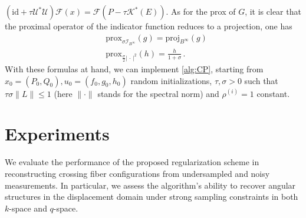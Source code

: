\documentclass[journal,twoside,web]{ieeecolor}
\begin{document}
$ (\mathrm{id}+\tau\mathcal{U}^*\mathcal{U})\mathcal{F}(x)=\mathcal{F}({P-\tau \mathcal{K}^*(E)}) $.
As for the prox of $G$, it is clear that the proximal operator of the indicator function reduces to a projection, one has
\begin{subequations}
\begin{alignat}{2}
    & \mathrm{prox}_{\sigma\mathcal{I}_{B^\infty}}(g) = \mathrm{proj}_{B^\infty}(g) \\
    & \mathrm{prox}_{\tfrac{\sigma}{2}|\,\cdot\,|^2}(h) = \frac{h}{1+\sigma} \, .
\end{alignat}
\end{subequations}
With these formulas at hand, we can implement \eqref{alg:CP}, starting from $x_0=(P_0,Q_0), u_0=(f_0,g_0,h_0)$ random initializations, $\tau,\sigma>0$ such that $\tau\sigma\|L\| \le 1$ (here $\|\cdot\|$ stands for the spectral norm) and $\rho^{(i)}=1$ constant.

\section{Experiments}
We evaluate the performance of the proposed regularization scheme in reconstructing crossing fiber configurations from undersampled and noisy measurements. In particular, we assess the algorithm’s ability to recover angular structures in the displacement domain under strong sampling constraints in both $k$-space and $q$-space.
\end{document}
